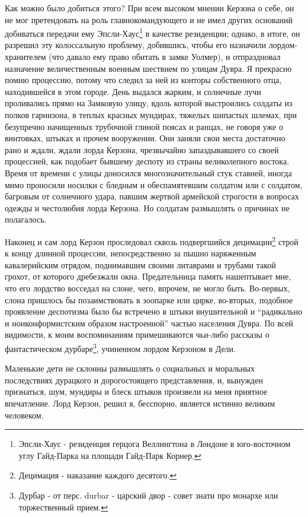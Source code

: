 \documentclass[
  oneside,
  12pt,
  titlepage]{book}
\begin{document}
Как можно было добиться этого? При всем высоком мнении Керзона о себе, он не мог претендовать на роль главнокомандующего и не имел других оснований добиваться передачи ему Эпсли-Хаус\footnote{Эпсли-Хаус - резиденция герцога Веллингтона в Лондоне в юго-восточном углу Гайд-Парка на площади Гайд-Парк Корнер.} в качестве резиденции; однако, в итоге, он разрешил эту колоссальную проблему, добившись, чтобы его назначили лордом-хранителем (что давало ему право обитать в замке Уолмер), и отпраздновал назначение величественным военным шествием по улицам Дувра. Я прекрасно помню процессию, потому что следил за ней из конторы собственного отца, находившейся в этом городе. День выдался жарким, и солнечные лучи проливались прямо на Замковую улицу, вдоль которой выстроились солдаты из полков гарнизона, в теплых красных мундирах, тяжелых шипастых шлемах, при безупречно начищенных трубочной глиной поясах и ранцах, не говоря уже о винтовках, штыках и прочем вооружении. Они заняли свои места достаточно рано и ждали, ждали лорда Керзона, чрезвычайно запаздывавшего со своей процессией, как подобает бывшему деспоту из страны великолепного востока. Время от времени с улицы доносился многозначительный стук ставней, иногда мимо проносили носилки с бледным и обеспамятевшим солдатом или с солдатом, багровым от солнечного удара, павшим жертвой армейской строгости в вопросах одежды и честолюбия лорда Керзона. Но солдатам размышлять о причинах не полагалось.

Наконец и сам лорд Керзон проследовал сквозь подвергшийся децимации\footnote{Децимация - наказание каждого десятого.} строй к концу длинной процессии, непосредственно за пышно наряженным кавалерийским отрядом, поднимавшим своими литаврами и трубами такой грохот, от которого дребезжали окна. Предательница память нашептывает мне, что его лордство восседал на слоне, чего, впрочем, не могло быть. Во-первых, слона пришлось бы позаимствовать в зоопарке или цирке, во-вторых, подобное проявление деспотизма было бы встречено в штыки внушительной и ``радикально и нонконформистским образом настроенной'' частью населения Дувра. По всей видимости, к моим воспоминаниям примешиваются чьи-либо рассказы о фантастическом дурбаре\footnote{Дурбар - от перс. durbar - царский двор - совет знати про монархе или торжественный прием.}, учиненном лордом Керзоном в Дели.

Маленькие дети не склонны размышлять о социальных и моральных последствиях дурацкого и дорогостоящего представления, и, вынужден признаться, шум, мундиры и блеск штыков произвели на меня приятное впечатление. Лорд Керзон, решил я, бесспорно, является истинно великим человеком.
\end{document}
